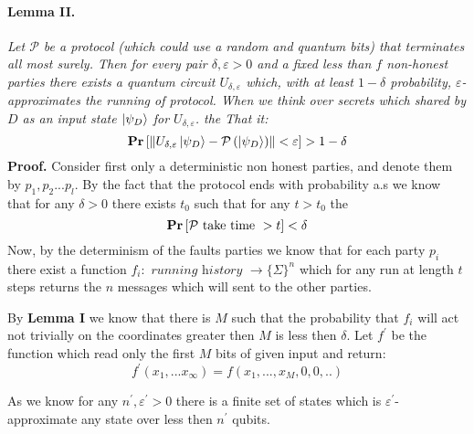 \documentclass{article}
\begin{document}
\begin{multicols*}{2}
\paragraph{Lemma II.} \textit{Let \(\mathcal{P}\) be a protocol (which could use a random and quantum bits) that terminates all most surely. Then for every pair \( \delta,\varepsilon >0 \) and a fixed less than \(f\) non-honest parties there exists a quantum circuit \(U_{\delta,\varepsilon}\) which, with at least \(1 - \delta\) probability, \(\varepsilon\)-approximates the running of protocol. When we think over secrets which shared by \(D\) as an input state \( \ket{\psi_{D}} \) for \(U_{\delta,\varepsilon}\). the That it:  
\begin{equation*}
    \mathbf{Pr} \left[ {\left\lVert U_{\delta,\varepsilon}\ket{\psi_{D}} - \mathcal{P}\left(\ket{\psi_{D}}\right)\right\rVert < \varepsilon} \right] > 1 - \delta      
\end{equation*}
}
\textbf{Proof.} Consider first only a deterministic non honest parties, and denote them by \(p_{1},p_{2} ... p_{l}\). By the fact that the protocol ends with probability a.s we know that for any \(\delta > 0 \) there exists \(t_{0}\) such that for any \(t > t_{0}\) the 
\begin{equation*}
    \mathbf{Pr} \left[ { \mathcal{P} \text{ take time } > t  } \right] < \delta
\end{equation*}Now, by the determinism of the faults parties we know that for each party \(p_{i}\) there exist a function \(f_{i} : \textit{ running history } \rightarrow \{\Sigma\}^{n}  \) which for any run at length \(t\) steps returns the \(n\) messages which will sent to the other parties.


By \textbf{Lemma I} we know that there is \(M\) such that the probability that \(f_{i}\) will act not trivially on the coordinates greater then \(M\) is less then \( \delta \). Let \(f^\prime\) be the function which read only the first \(M\) bits of given input and return: 
\begin{equation*}
    f^\prime\left(x_{1} , ... x_{\infty} \right) = f\left(x_{1} , ..., x_{M}, 0,0,..\right) 
\end{equation*}

As we know for any \(n^{\prime}, \varepsilon^{\prime}>0\) there is a finite set of states which is \(\varepsilon^{\prime}\)-approximate any state over less then \(n^{\prime}\) qubits. 


\end{multicols*}
\end{document}
